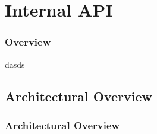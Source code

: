 
\section{Internal API}
\begin{frame}\frametitle{Overview}
  dasds
\end{frame}

\subsection{Architectural Overview}
\begin{frame}\frametitle{Architectural Overview}
\end{frame}
